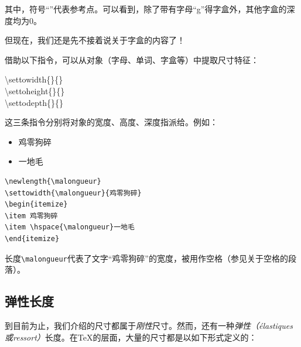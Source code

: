 \begin{center}
\end{center}

其中，符号“”代表参考点。可以看到，除了带有字母“g”得字盒外，其他字盒的深度均为0。

但现在，我们还是先不接着说关于字盒的内容了！

借助以下指令，可以从对象（字母、单词、字盒等）中提取尺寸特征：

\begin{dmd}
\backslash settowidth\{\}\{\}\\
\backslash settoheight\{\}\{\}\\
\backslash settodepth\{\}\{\}
\end{dmd}

这三条指令分别将对象的宽度、高度、深度指派给。例如：

\begin{codelist}[4.1]{
\newlength{\malongueur}
\settowidth{\malongueur}{鸡零狗碎}
\begin{itemize}
\item 鸡零狗碎
\item \hspace{\malongueur}一地毛
\end{itemize}
}\begin{verbatim}
\newlength{\malongueur}
\settowidth{\malongueur}{鸡零狗碎}
\begin{itemize}
\item 鸡零狗碎
\item \hspace{\malongueur}一地毛
\end{itemize}
\end{verbatim}
\end{codelist}

长度\verb|\malongueur|代表了文字“鸡零狗碎”的宽度，被用作空格（参见关于空格的段落）。

\subsection{弹性长度}

到目前为止，我们介绍的尺寸都属于\emph{刚性}尺寸。然而，还有一种\emph{弹性（élastiques或ressort）}长度。在\TeX 的层面，大量的尺寸都是以如下形式定义的：


